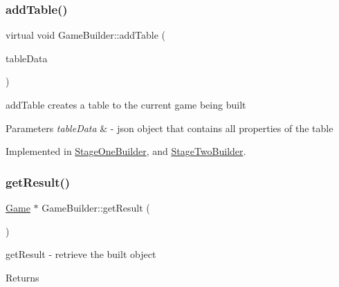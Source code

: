 \mbox{\label{class_game_builder_a65fb629009c18956a8d592352eda1eb5}} 
\subsubsection{\texorpdfstring{add\+Table()}{addTable()}}
{\footnotesize\ttfamily virtual void Game\+Builder\+::add\+Table (\begin{DoxyParamCaption}\item[{Q\+Json\+Object \&}]{table\+Data }\end{DoxyParamCaption})\hspace{0.3cm}{\ttfamily [pure virtual]}}



add\+Table creates a table to the current game being built 


\begin{DoxyParams}{Parameters}
{\em table\+Data} & -\/ json object that contains all properties of the table \\
\hline
\end{DoxyParams}


Implemented in \mbox{\hyperlink{class_stage_one_builder_ac8f35ec11ebe31010410bc50b0149ce9}{Stage\+One\+Builder}}, and \mbox{\hyperlink{class_stage_two_builder_a7326ee514e752cab6d994352f5ef68e0}{Stage\+Two\+Builder}}.

\mbox{\label{class_game_builder_a490e3dbb7f8289edb2a080a3383f8607}} 
\subsubsection{\texorpdfstring{get\+Result()}{getResult()}}
{\footnotesize\ttfamily \mbox{\hyperlink{class_game}{Game}} $\ast$ Game\+Builder\+::get\+Result (\begin{DoxyParamCaption}{ }\end{DoxyParamCaption})\hspace{0.3cm}{\ttfamily [virtual]}}



get\+Result -\/ retrieve the built object 

\begin{DoxyReturn}{Returns}

\end{DoxyReturn}


